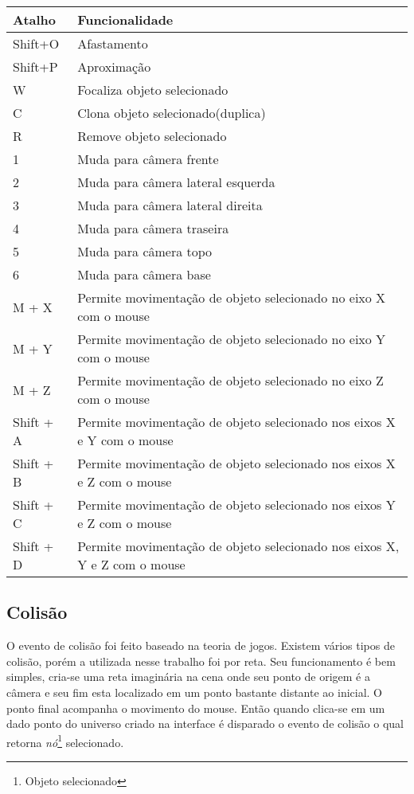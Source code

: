 \begin{center}
\begin{tabular}{|l|l|}
	\hline
		Atalho & Funcionalidade \\ \hline
		Shift+O &  Afastamento\\ \hline
		Shift+P &  Aproximação\\ \hline
		W & Focaliza objeto selecionado\\ \hline
		C & Clona objeto selecionado(duplica)\\ \hline
		R & Remove objeto selecionado \\ \hline
		1 & Muda para câmera frente \\ \hline
		2 & Muda para câmera lateral esquerda \\ \hline
		3 & Muda para câmera lateral direita \\ \hline
		4 & Muda para câmera traseira \\ \hline
		5 & Muda para câmera topo \\ \hline
		6 & Muda para câmera base \\ \hline
		M + X & Permite movimentação de objeto selecionado no eixo X com o mouse \\ \hline
		M + Y & Permite movimentação de objeto selecionado no eixo Y com o mouse \\ \hline
		M + Z & Permite movimentação de objeto selecionado no eixo Z com o mouse \\ \hline
		Shift + A & Permite movimentação de objeto selecionado nos eixos X e Y com o mouse \\ \hline
		Shift + B & Permite movimentação de objeto selecionado nos eixos X e Z com o mouse \\ \hline
		Shift + C & Permite movimentação de objeto selecionado nos eixos Y e Z com o mouse \\ \hline
		Shift + D & Permite movimentação de objeto selecionado nos eixos X, Y e Z com o mouse \\ 
	\hline
\end{tabular}
\end{center}
	
	\subsection{Colisão}
	O evento de colisão foi feito baseado na teoria de jogos. Existem vários tipos de colisão, porém a utilizada nesse trabalho foi por reta. Seu funcionamento é bem simples, cria-se uma reta imaginária na cena onde seu ponto de origem é a câmera e seu fim esta localizado em um ponto bastante distante ao inicial. O ponto final acompanha o movimento do mouse. Então quando clica-se em um dado ponto do universo criado na interface é disparado o evento de colisão o qual retorna \textit{nó}\footnote{Objeto selecionado} selecionado. \\
	
